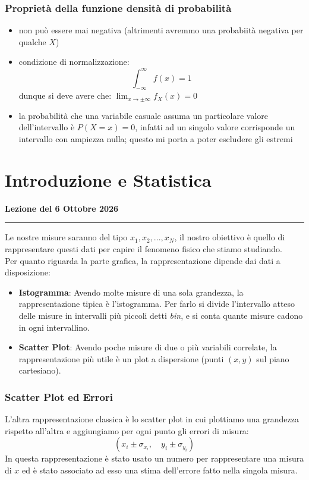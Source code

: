 \documentclass{article}
\theoremstyle{remark}
\newcommand{\thelezione}{}
\newcommand{\lezione}[2]{
\newpage
\renewcommand{\thelezione}{#2} 
\section{#1} 
\noindent\textbf{\color{RoyalBlue}Lezione del #2}\par\vspace{0.5em}\hrule\vspace{1em}
}
\begin{document}
\subsubsection{Proprietà della funzione densità di probabilità}
\begin{itemize}
    \item non può essere mai negativa (altrimenti avremmo una probabiità negativa per qualche $X$)
    \item condizione di normalizzazione: \[ \int_{- \infty}^{\infty} f(x)=1\]
    dunque si deve avere che: $\lim_{x \rightarrow \pm \infty} f_X(x)=0$
    \item la probabilità che una variabile casuale assuma un particolare valore dell'intervallo è $P(X=x)=0$, infatti ad un singolo valore corrisponde un intervallo con ampiezza nulla; questo mi porta a poter escludere gli estremi
\end{itemize}



\lezione{Introduzione e Statistica}{6 Ottobre 2026} 
Le nostre misure saranno del tipo ${x_1, x_2, ..., x_N}$, il nostro obiettivo è quello di rappresentare questi dati per capire il fenomeno fisico
che stiamo studiando.\\
Per quanto riguarda la parte grafica, la rappresentazione dipende dai dati a disposizione:
\begin{itemize}
    \item \textbf{Istogramma}: Avendo molte misure di una sola grandezza, la rappresentazione tipica è l'istogramma. Per farlo si divide l'intervallo atteso delle misure in intervalli più piccoli detti \textit{bin}, e si conta quante misure cadono in ogni intervallino.
    \item \textbf{Scatter Plot}: Avendo poche misure di due o più variabili correlate, la rappresentazione più utile è un plot a dispersione (punti $(x,y)$ sul piano cartesiano).
\end{itemize}

\subsubsection{Scatter Plot ed Errori}
L'altra rappresentazione classica è lo scatter plot in cui plottiamo una grandezza rispetto all'altra e aggiungiamo per ogni punto gli errori di misura:
\[ (x_i \pm \sigma_{x_i}, \quad y_i \pm \sigma_{y_i}) \]
In questa rappresentazione è stato usato un numero per rappresentare una misura di $x$ ed è stato associato ad esso una stima dell'errore fatto nella singola misura.
\end{document}

